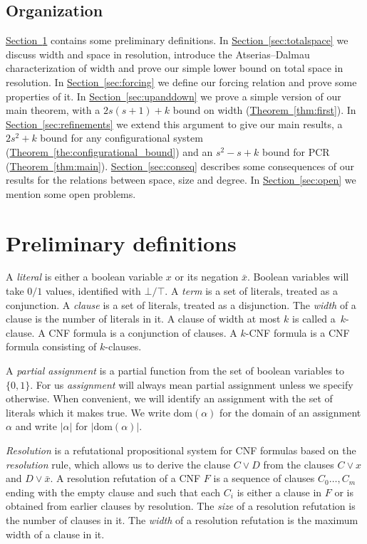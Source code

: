 \documentclass[11pt]{article}
\numberwithin{equation}{section}
\theoremstyle{definition}
\theoremstyle{plain}
\newcommand{\expref}[2]{\hyperref[#2]{#1~\ref{#2}}}
\newcommand\dom{\mathrm{dom}}
\begin{document}
\subsection{Organization}

\expref{Section}{sec:definitions} contains some preliminary definitions.
In \expref{Section}{sec:totalspace} we discuss width and space in resolution,
introduce the Atserias--Dalmau characterization of width
and prove our simple lower bound on total space in resolution.
In \expref{Section}{sec:forcing} we define our forcing relation
and prove some properties of it.
In \expref{Section}{sec:upanddown} we prove a simple version
of our main theorem, with a $2s(s+1)+k$ bound on width (\expref{Theorem}{thm:first}).
In \expref{Section}{sec:refinements} we extend this argument to 
give our main results, a $2s^2+k$ bound for any configurational system
(\expref{Theorem}{the:configurational_bound})
and an $s^2-s+k$ bound for PCR (\expref{Theorem}{thm:main}).
\expref{Section}{sec:conseq} describes some consequences of our
results for the relations between space, size and degree.
In \expref{Section}{sec:open} we mention some open problems.


%
\section{Preliminary definitions}\label{sec:definitions}
%

A \emph{literal} is either a boolean variable $x$ or its negation $\bar x$.
Boolean variables will take $0/1$ values,  
identified with $\bot/ \top$. 
A \emph{term} is a set of literals, treated as a conjunction.
A \emph{clause} is a set of literals, treated as a disjunction. 
The \emph{width} of a clause is the number of literals in it.  A clause of width 
at most $k$ is called a~$k$-clause. A CNF formula  is a conjunction of clauses. A $k$-CNF formula is a CNF formula consisting of $k$-clauses.


A \emph{partial assignment} is a partial function from the set of boolean
variables to $\{0,1\}$. 
For us \emph{assignment} will always mean partial assignment unless we specify otherwise.
When convenient, we will identify an assignment with the set of literals which it makes true.
We write $\dom(\alpha)$ for the domain  of an assignment $\alpha$
and write $|\alpha|$ for $|\dom(\alpha)|$.



\emph{Resolution}
 is a refutational propositional system for CNF formulas based on the 
 \emph{resolution} rule, 
 which allows us to derive the clause $C \vee D$ from the clauses
 $C \vee x$ and $D \vee \bar x$.
A resolution refutation of a CNF $F$ is a sequence of clauses $C_0 \ldots, C_m$ ending with the empty clause 
and such that each $C_i$ is either a clause in $F$ or is obtained from earlier clauses  by 
resolution. 
The \emph{size} of a resolution refutation is the number of clauses in it. The \emph{width} of a resolution refutation is the maximum width
of a clause in it.
 
\end{document}
